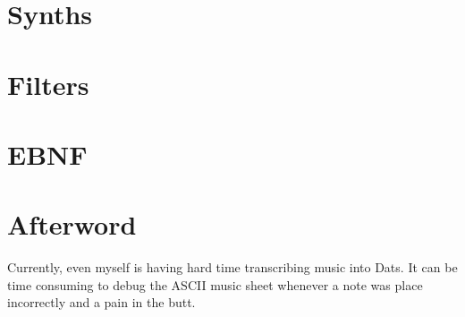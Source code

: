 \documentclass[11pt]{article}
\newcounter{numpar}
\let\stdsection\section
\renewcommand\section{\clearpage\setcounter{numpar}{0}\stdsection}
\begin{document}
\section{Synths}

\section{Filters}

\section{EBNF}
\section*{Afterword}

Currently, even myself is having hard time transcribing music into Dats. It can be time consuming to debug the ASCII music sheet whenever a note was place 
incorrectly and a pain in the butt.
\end{document}
